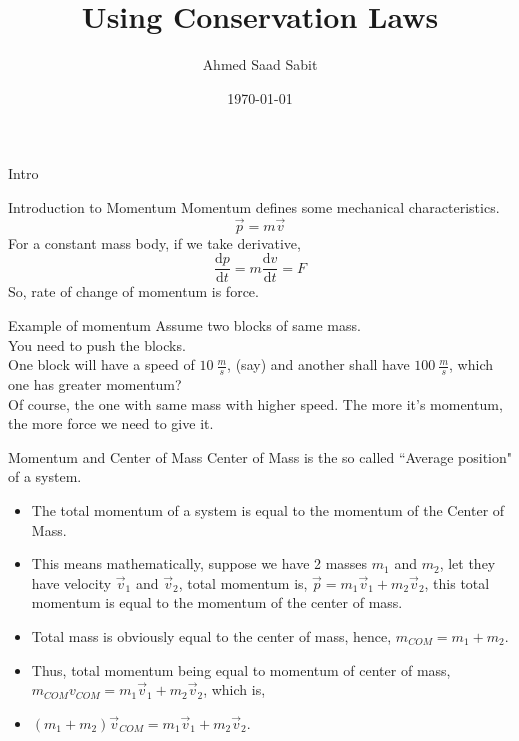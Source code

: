 \documentclass[9pt,serif]{beamer}
\title{Using Conservation Laws} \author{Ahmed Saad Sabit} \date{\today}
\begin{document}
\begin{frame}{Intro} \titlepage  \end{frame}



\begin{frame}{ Introduction to Momentum} 
    Momentum defines some mechanical characteristics. 
    \[ \vec p = m \vec v  \]
    For a constant mass body, if we take derivative, 
    \[ \frac{\mathrm d p}{\mathrm d t} = m \frac{\mathrm d v}{ \mathrm d t} = F \]
    So, rate of change of momentum is force.        
\end{frame}





\begin{frame}
    { Example of momentum}
    Assume two blocks of same mass.\\
    You need to push the blocks.\\
    One block will have a speed of $10 \ \frac{m}{s}$, (say) and another shall have $100 \ \frac{m}{s}$, which one has greater momentum?\\ \pause
    Of course, the one with same mass with higher speed. \pause
    The more it's momentum, the more force we need to give it. 
\end{frame}




\begin{frame}
    { Momentum and Center of Mass}
    Center of Mass is the so called ``Average position" of a system. \\ \pause
    \begin{itemize}
        \item The total momentum of a system is equal to the momentum of the Center of Mass.  \pause
        \item This means mathematically, suppose we have 2 masses $m_1 $ and $m_2$, let they have velocity $\vec v_1$ and $\vec v_2$, total momentum is, $\vec p = m_1 \vec v_1 + m_2 \vec v_2$, this total momentum is equal to the momentum of the center of mass.  \pause
        \item Total mass is obviously equal to the center of mass, hence, $ m_{ COM} = m_1 + m_2  $.  \pause
        \item Thus, total momentum being equal to momentum of center of mass, $m_{ COM} v_{ COM} = m_1 \vec v_1 + m_2 \vec v_2  $, which is, \pause
        \item $(m_1 + m_2) \vec{ v}_{ COM}  = m_1 \vec v_1 + m_2 \vec v_2 $.
    \end{itemize}
\end{frame}
\end{document}
